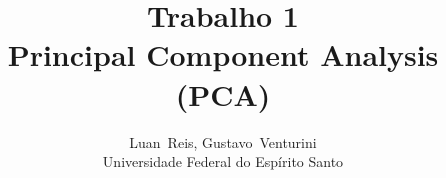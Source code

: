 \documentclass[journal]{IEEEtran}
\begin{document}
%

\title{Trabalho 1\\Principal Component Analysis (PCA)}

%
%
%


\author{Luan~Reis, Gustavo~Venturini\\
				Universidade Federal do Espírito Santo}



%
%
\end{document}
